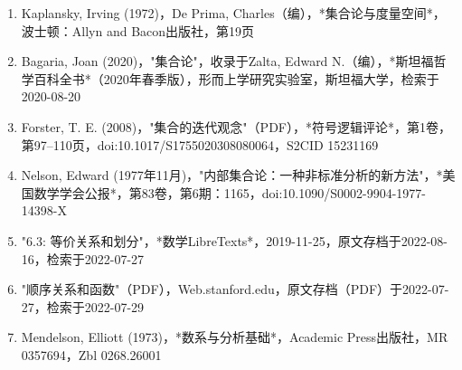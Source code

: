 \begin{enumerate}
\item Kaplansky, Irving (1972)，De Prima, Charles（编），*集合论与度量空间*，波士顿：Allyn and Bacon出版社，第19页
\item Bagaria, Joan (2020)，"集合论"，收录于Zalta, Edward N.（编），*斯坦福哲学百科全书*（2020年春季版），形而上学研究实验室，斯坦福大学，检索于2020-08-20  
\item Forster, T. E. (2008)，"集合的迭代观念"（PDF），*符号逻辑评论*，第1卷，第97–110页，doi:10.1017/S1755020308080064，S2CID 15231169  
\item Nelson, Edward (1977年11月)，"内部集合论：一种非标准分析的新方法"，*美国数学学会公报*，第83卷，第6期：1165，doi:10.1090/S0002-9904-1977-14398-X
\item "6.3: 等价关系和划分"，*数学LibreTexts*，2019-11-25，原文存档于2022-08-16，检索于2022-07-27  
\item "顺序关系和函数"（PDF），Web.stanford.edu，原文存档（PDF）于2022-07-27，检索于2022-07-29  
\item Mendelson, Elliott (1973)，*数系与分析基础*，Academic Press出版社，MR 0357694，Zbl 0268.26001
\end{enumerate}